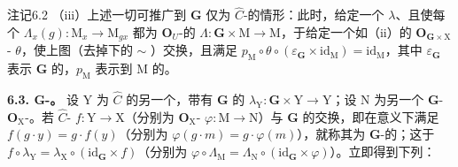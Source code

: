 \begin{SGAresult}{注记}{6.2}
（iii）上述一切可推广到 $\mathbf G$ 仅为 $\widehat C$-的情形：此时，给定一个 $\lambda$、且使每个 $\Lambda_x(g):\mathrm M_x\to\mathrm M_{gx}$ 都为 $\mathbf O_U$-的 $\Lambda:\mathbf G\times\mathrm M\to\mathrm M$，于给定一个如（ii）的 $\mathbf O_{\mathbf G\times\mathrm X}$- $\theta$，使上图（去掉下的 $\sim$ ）交换，且满足 $p_{\mathrm M}\circ\theta\circ(\varepsilon_{\mathbf G}\times\mathrm{id}_{\mathrm M})=\mathrm{id}_{\mathrm M}$，其中 $\varepsilon_{\mathbf G}$ 表示 $\mathbf G$ 的，$p_{\mathrm M}$ 表示到 $\mathrm M$ 的。
\end{SGAresult}

\textbf{6.3. $\mathbf G$-。} 设 $\mathrm Y$ 为 $\widehat C$ 的另一个，带有 $\mathbf G$ 的 $\lambda_{\mathrm Y}:\mathbf G\times\mathrm Y\to\mathrm Y$；设 $\mathrm N$ 为另一个 $\mathbf G$- $\mathbf O_{\mathrm X}$-。若 $\widehat C$- $f:\mathrm Y\to\mathrm X$（分别为 $\mathbf O_{\mathrm X}$- $\varphi:\mathrm M\to\mathrm N$）与 $\mathbf G$ 的交换，即在意义下满足 $f(g\cdot y)=g\cdot f(y)$（分别为 $\varphi(g\cdot m)=g\cdot\varphi(m)$），就称其为 $\mathbf G$-的；这于 $f\circ\lambda_{\mathrm Y}=\lambda_{\mathrm X}\circ(\mathrm{id}_{\mathbf G}\times f)$（分别为 $\varphi\circ\Lambda_{\mathrm M}=\Lambda_{\mathrm N}\circ(\mathrm{id}_{\mathbf G}\times\varphi)$）。立即得到下列：

